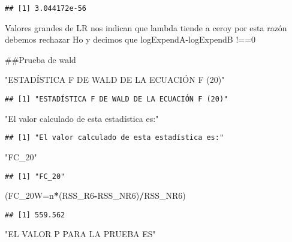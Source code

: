 \documentclass[
]{article}
\newenvironment{Shaded}{\begin{snugshade}}{\end{snugshade}}
\newcommand{\DataTypeTok}[1]{\textcolor[rgb]{0.13,0.29,0.53}{#1}}
\newcommand{\NormalTok}[1]{#1}
\newcommand{\OperatorTok}[1]{\textcolor[rgb]{0.81,0.36,0.00}{\textbf{#1}}}
\newcommand{\StringTok}[1]{\textcolor[rgb]{0.31,0.60,0.02}{#1}}
\begin{document}
\begin{verbatim}
## [1] 3.044172e-56
\end{verbatim}

Valores grandes de LR nos indican que lambda tiende a ceroy por esta
razón debemos rechazar Ho y decimos que logExpendA-logExpendB !==0

\#\#Prueba de wald

\begin{Shaded}
\begin{Highlighting}[]
\StringTok{"ESTADÍSTICA F DE WALD DE LA ECUACIÓN F (20)"}
\end{Highlighting}
\end{Shaded}

\begin{verbatim}
## [1] "ESTADÍSTICA F DE WALD DE LA ECUACIÓN F (20)"
\end{verbatim}

\begin{Shaded}
\begin{Highlighting}[]
\StringTok{"El valor calculado de esta estadística es:"}
\end{Highlighting}
\end{Shaded}

\begin{verbatim}
## [1] "El valor calculado de esta estadística es:"
\end{verbatim}

\begin{Shaded}
\begin{Highlighting}[]
\StringTok{"FC_20"}
\end{Highlighting}
\end{Shaded}

\begin{verbatim}
## [1] "FC_20"
\end{verbatim}

\begin{Shaded}
\begin{Highlighting}[]
\NormalTok{(}\DataTypeTok{FC_20W=}\NormalTok{n}\OperatorTok{*}\NormalTok{(RSS_R6}\OperatorTok{-}\NormalTok{RSS_NR6)}\OperatorTok{/}\NormalTok{RSS_NR6)}
\end{Highlighting}
\end{Shaded}

\begin{verbatim}
## [1] 559.562
\end{verbatim}

\begin{Shaded}
\begin{Highlighting}[]
\StringTok{"EL VALOR P PARA LA PRUEBA ES"}
\end{Highlighting}
\end{Shaded}
\end{document}
